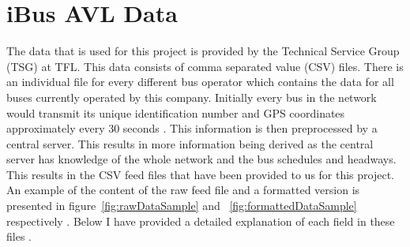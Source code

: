 \section{iBus AVL Data}
The data that is used for this project is provided by the Technical Service Group (TSG) at TFL. This data consists of comma separated value (CSV) files. There is an individual file for every different bus operator which contains the data for all buses currently operated by this company. Initially every bus in the network would transmit its unique identification number and GPS coordinates approximately every 30 seconds \cite{Hounsell201276}. This information is then preprocessed by a central server. This results in more information being derived as the central server has knowledge of the whole network and the bus schedules and headways. This results in the CSV feed files that have been provided to us for this project. An example of the content of the raw feed file and a formatted version is presented in figure~\ref{fig:rawDataSample} and ~\ref{fig:formattedDataSample} respectively . Below I have provided a detailed explanation of each field in these files \cite{infoBusesInservice}.

